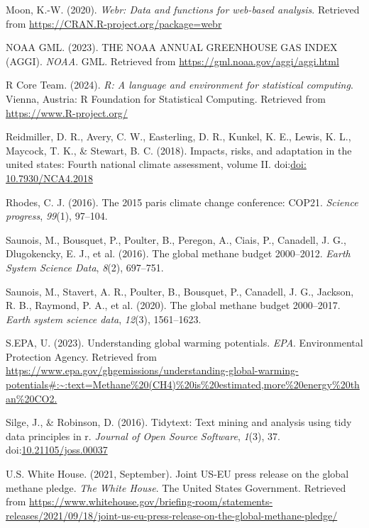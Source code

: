 \documentclass[10pt,a4paper,onecolumn]{article}
\newlength{\cslhangindent}
\newenvironment{CSLReferences}[2] %
 {\begin{list}{}{%
  \setlength{\itemindent}{0pt}
  \setlength{\leftmargin}{0pt}
  \setlength{\parsep}{0pt}
  \ifodd #1
   \setlength{\leftmargin}{\cslhangindent}
   \setlength{\itemindent}{-1\cslhangindent}
  \fi
  \setlength{\itemsep}{#2\baselineskip}}}
 {\end{list}}
\begin{document}
\begin{CSLReferences}{1}{0}
Moon, K.-W. (2020). \emph{Webr: Data and functions for web-based
analysis}. Retrieved from \url{https://CRAN.R-project.org/package=webr}

NOAA GML. (2023). THE NOAA ANNUAL GREENHOUSE GAS INDEX (AGGI).
\emph{NOAA}. GML. Retrieved from
\url{https://gml.noaa.gov/aggi/aggi.html}

R Core Team. (2024). \emph{R: A language and environment for statistical
computing}. Vienna, Austria: R Foundation for Statistical Computing.
Retrieved from \url{https://www.R-project.org/}

Reidmiller, D. R., Avery, C. W., Easterling, D. R., Kunkel, K. E.,
Lewis, K. L., Maycock, T. K., \& Stewart, B. C. (2018). Impacts, risks,
and adaptation in the united states: Fourth national climate assessment,
volume II. doi:\href{https://doi.org/doi:\%2010.7930/NCA4.2018}{doi:
10.7930/NCA4.2018}

Rhodes, C. J. (2016). The 2015 paris climate change conference: COP21.
\emph{Science progress}, \emph{99}(1), 97--104.

Saunois, M., Bousquet, P., Poulter, B., Peregon, A., Ciais, P.,
Canadell, J. G., Dlugokencky, E. J., et al. (2016). The global methane
budget 2000--2012. \emph{Earth System Science Data}, \emph{8}(2),
697--751.

Saunois, M., Stavert, A. R., Poulter, B., Bousquet, P., Canadell, J. G.,
Jackson, R. B., Raymond, P. A., et al. (2020). The global methane budget
2000--2017. \emph{Earth system science data}, \emph{12}(3), 1561--1623.

S.EPA, U. (2023). Understanding global warming potentials. \emph{EPA}.
Environmental Protection Agency. Retrieved from
\url{https://www.epa.gov/ghgemissions/understanding-global-warming-potentials\#:~:text=Methane\%20(CH4)\%20is\%20estimated,more\%20energy\%20than\%20CO2.}

Silge, J., \& Robinson, D. (2016). Tidytext: Text mining and analysis
using tidy data principles in r. \emph{Journal of Open Source Software},
\emph{1}(3), 37.
doi:\href{https://doi.org/10.21105/joss.00037}{10.21105/joss.00037}

U.S. White House. (2021, September). Joint US-EU press release on the
global methane pledge. \emph{The White House}. The United States
Government. Retrieved from
\url{https://www.whitehouse.gov/briefing-room/statements-releases/2021/09/18/joint-us-eu-press-release-on-the-global-methane-pledge/}

\end{CSLReferences}
\end{document}
